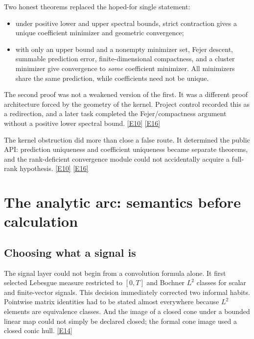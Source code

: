 \documentclass[11pt,a4paper]{article}
\newcommand{\ev}[1]{%
  \hyperref[ev:#1]{\textcolor{ReportBlue}{\textsf{\scriptsize[#1]}}}}
\begin{document}
Two honest theorems replaced the hoped-for single statement:

\begin{itemize}
  \item under positive lower and upper spectral bounds, strict contraction gives a
    unique coefficient minimizer and geometric convergence;
  \item with only an upper bound and a nonempty minimizer set, Fejer descent,
    summable prediction error, finite-dimensional compactness, and a cluster
    minimizer give convergence to \emph{some} coefficient minimizer. All minimizers
    share the same prediction, while coefficients need not be unique.
\end{itemize}

The second proof was not a weakened version of the first. It was a different proof
architecture forced by the geometry of the kernel. Project control recorded this as
a redirection, and a later task completed the Fejer/compactness argument without a
positive lower spectral bound. \ev{E10}\ev{E16}

\begin{turningpoint}
The kernel obstruction did more than close a false route. It determined the public
API: prediction uniqueness and coefficient uniqueness became separate theorems, and
the rank-deficient convergence module could not accidentally acquire a full-rank
hypothesis. \ev{E10}\ev{E16}
\end{turningpoint}

\section{The analytic arc: semantics before calculation}
\label{sec:analysis-arc}

\subsection{Choosing what a signal is}

The signal layer could not begin from a convolution formula alone. It first selected
Lebesgue measure restricted to \([0,T]\) and Bochner \(L^2\) classes for scalar and
finite-vector signals. This decision immediately corrected two informal habits.
Pointwise matrix identities had to be stated almost everywhere because \(L^2\)
elements are equivalence classes. And the image of a closed cone under a bounded
linear map could not simply be declared closed; the formal cone image used a closed
conic hull. \ev{E14}
\end{document}
